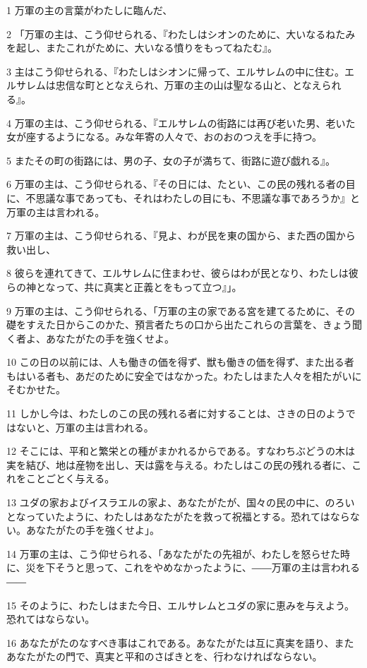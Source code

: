 \par 1 万軍の主の言葉がわたしに臨んだ、
\par 2 「万軍の主は、こう仰せられる、『わたしはシオンのために、大いなるねたみを起し、またこれがために、大いなる憤りをもってねたむ』。
\par 3 主はこう仰せられる、『わたしはシオンに帰って、エルサレムの中に住む。エルサレムは忠信な町ととなえられ、万軍の主の山は聖なる山と、となえられる』。
\par 4 万軍の主は、こう仰せられる、『エルサレムの街路には再び老いた男、老いた女が座するようになる。みな年寄の人々で、おのおのつえを手に持つ。
\par 5 またその町の街路には、男の子、女の子が満ちて、街路に遊び戯れる』。
\par 6 万軍の主は、こう仰せられる、『その日には、たとい、この民の残れる者の目に、不思議な事であっても、それはわたしの目にも、不思議な事であろうか』と万軍の主は言われる。
\par 7 万軍の主は、こう仰せられる、『見よ、わが民を東の国から、また西の国から救い出し、
\par 8 彼らを連れてきて、エルサレムに住まわせ、彼らはわが民となり、わたしは彼らの神となって、共に真実と正義とをもって立つ』」。
\par 9 万軍の主は、こう仰せられる、「万軍の主の家である宮を建てるために、その礎をすえた日からこのかた、預言者たちの口から出たこれらの言葉を、きょう聞く者よ、あなたがたの手を強くせよ。
\par 10 この日の以前には、人も働きの価を得ず、獣も働きの価を得ず、また出る者もはいる者も、あだのために安全ではなかった。わたしはまた人々を相たがいにそむかせた。
\par 11 しかし今は、わたしのこの民の残れる者に対することは、さきの日のようではないと、万軍の主は言われる。
\par 12 そこには、平和と繁栄との種がまかれるからである。すなわちぶどうの木は実を結び、地は産物を出し、天は露を与える。わたしはこの民の残れる者に、これをことごとく与える。
\par 13 ユダの家およびイスラエルの家よ、あなたがたが、国々の民の中に、のろいとなっていたように、わたしはあなたがたを救って祝福とする。恐れてはならない。あなたがたの手を強くせよ」。
\par 14 万軍の主は、こう仰せられる、「あなたがたの先祖が、わたしを怒らせた時に、災を下そうと思って、これをやめなかったように、――万軍の主は言われる――
\par 15 そのように、わたしはまた今日、エルサレムとユダの家に恵みを与えよう。恐れてはならない。
\par 16 あなたがたのなすべき事はこれである。あなたがたは互に真実を語り、またあなたがたの門で、真実と平和のさばきとを、行わなければならない。
